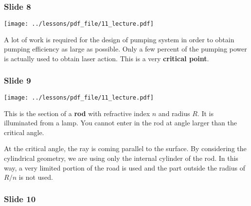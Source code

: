 \documentclass[../main/main.tex]{subfiles}
\begin{document}
\subsubsection*{Slide 8}

\begin{minipage}[]{0.5\linewidth}
\centering
\texttt{[image: ../lessons/pdf\_file/11\_lecture.pdf]}
\end{minipage}
\hspace{0.3cm}\vspace{0.3cm}
\begin{minipage}[c]{0.47\linewidth}

A lot of work is required for the design of pumping system in order to obtain pumping efficiency as large as possible. Only a few percent of the pumping power is actually used to obtain laser action. This is a very \textbf{critical point}.

\end{minipage}

\subsubsection*{Slide 9}

\begin{minipage}[]{0.5\linewidth}
\centering
\texttt{[image: ../lessons/pdf\_file/11\_lecture.pdf]}
\end{minipage}
\hspace{0.3cm}\vspace{0.3cm}
\begin{minipage}[c]{0.47\linewidth}

This is the section of a \textbf{rod} with refractive index \( n \) and radius \( R \). It is illuminated from a lamp. You cannot enter in the rod at angle larger than the critical angle.

At the critical angle, the ray is coming parallel to the surface. By considering the cylindrical geometry, we are using only the internal cylinder of the rod. In this way, a very limited portion of the road is used and the part outside the radius of \( R/n \) is not used.

\end{minipage}

\subsubsection*{Slide 10}
\end{document}

